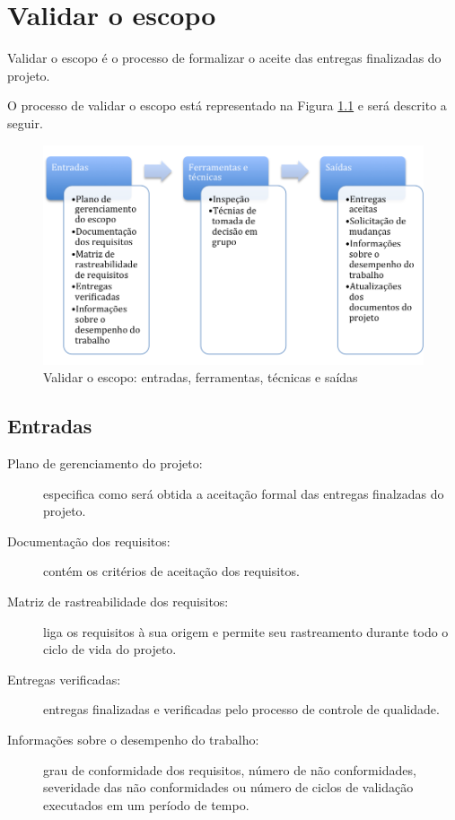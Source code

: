 \chapter{Validar o escopo}

Validar o escopo é o processo de formalizar o aceite das entregas finalizadas do projeto.

O processo de validar o escopo está representado na Figura \ref{fig:escopo:validar:efts} e será descrito a seguir.

\begin{figure}[!h]
	\centering
	\includegraphics[scale=0.5]{Figuras/escopo_efts_verificar.png}
	\caption{Validar o escopo: entradas, ferramentas, técnicas e saídas}
	\label{fig:escopo:validar:efts}
\end{figure}

\section{Entradas}

\begin{description}
	
	\item[Plano de gerenciamento do projeto:] especifica como será obtida a aceitação formal das entregas finalzadas do projeto.
	
	\item[Documentação dos requisitos:] contém os critérios de aceitação dos requisitos.
	
	\item[Matriz de rastreabilidade dos requisitos:] liga os requisitos à sua origem e permite seu rastreamento durante todo o ciclo de vida do projeto. 
	
	\item[Entregas verificadas:] entregas finalizadas e verificadas pelo processo de controle de qualidade.
	
	\item[Informações sobre o desempenho do trabalho:] grau de conformidade dos requisitos, número de não conformidades, severidade das não conformidades ou número de ciclos de validação executados em um período de tempo.
	
\end{description}

